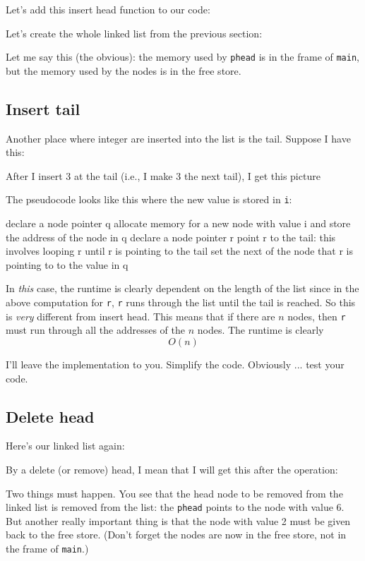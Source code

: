 Let's add this insert head function to our code:

Let's create the whole linked list from the previous section:

Let me say this (the obvious):
the memory used by \verb!phead! is in the frame of \verb!main!,
but the memory used by the nodes is in the free store.


\newpage
\subsection{Insert tail}

Another place where integer are inserted into the list is the tail.
Suppose I have this:



After I insert 3 at the tail (i.e., I make 3 the next tail), I get this
picture



The pseudocode looks like this where the new value is stored in \verb!i!:
\begin{console}[frame=single]
declare a node pointer q 
allocate memory for a new node with value i and
    store the address of the node in q
declare a node pointer r
point r to the tail: this involves looping r
    until r is pointing to the tail
set the next of the node that r is pointing to to the
    value in q
\end{console}

In \textit{this} case, the runtime is clearly dependent on the length
of the list since in the above computation for \verb!r!,
\verb!r! runs through the list until the tail is reached.
So this is \textit{very} different from insert head.
This means that if there are $n$ nodes, then \verb!r! must
run through all the addresses of the $n$ nodes.
The runtime is clearly
\[
O(n)
\]

I'll leave the implementation to you.
Simplify the code.
Obviously ... test your code.


\newpage
\subsection{Delete head}

Here's our linked list again:



By a delete (or remove) head, I mean that I will get this after the operation:



Two things must happen.
You see that the head node to be removed from the linked list
is removed from the list: the \verb!phead! points to the node with
value 6.
But another really important thing is that the node with value 2
must be given back to the free store.
(Don't forget the nodes are now in the free store, not in the frame of
\verb!main!.)

